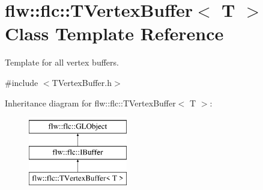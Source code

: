 \hypertarget{classflw_1_1flc_1_1TVertexBuffer}{}\section{flw\+:\+:flc\+:\+:T\+Vertex\+Buffer$<$ T $>$ Class Template Reference}
\label{classflw_1_1flc_1_1TVertexBuffer}


Template for all vertex buffers.  




{\ttfamily \#include $<$T\+Vertex\+Buffer.\+h$>$}

Inheritance diagram for flw\+:\+:flc\+:\+:T\+Vertex\+Buffer$<$ T $>$\+:\begin{figure}[H]
\begin{center}
\leavevmode
\includegraphics[height=3.000000cm]{classflw_1_1flc_1_1TVertexBuffer}
\end{center}
\end{figure}
